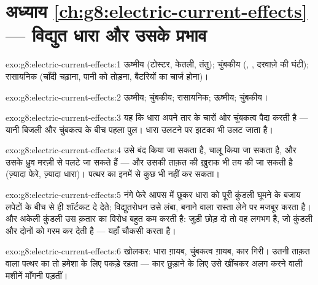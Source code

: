 \section*{अध्याय \ref{ch:g8:electric-current-effects} --- विद्युत धारा और उसके प्रभाव}

\begin{solution}{exo:g8:electric-current-effects:1}
ऊष्मीय (टोस्टर, केतली, तंतु); चुंबकीय (, , दरवाज़े
की घंटी); रासायनिक (चाँदी चढ़ाना, पानी को तोड़ना, बैटरियों का चार्ज
होना)।
\end{solution}

\begin{solution}{exo:g8:electric-current-effects:2}
ऊष्मीय; चुंबकीय; रासायनिक; ऊष्मीय; चुंबकीय।
\end{solution}

\begin{solution}{exo:g8:electric-current-effects:3}
यह कि धारा अपने तार के चारों ओर चुंबकत्व पैदा करती है --- यानी बिजली
और चुंबकत्व के बीच पहला पुल। धारा उलटने पर झटका भी उलट जाता है।
\end{solution}

\begin{solution}{exo:g8:electric-current-effects:4}
उसे बंद किया जा सकता है, चालू किया जा सकता है, और उसके ध्रुव मरज़ी से
पलटे जा सकते हैं --- और उसकी ताक़त की ख़ुराक भी तय की जा सकती है
(ज़्यादा फेरे, ज़्यादा धारा)। पत्थर का  इनमें से कुछ भी नहीं कर
सकता।
\end{solution}

\begin{solution}{exo:g8:electric-current-effects:5}
नंगे फेरे आपस में छूकर धारा को पूरी कुंडली घूमने के बजाय लपेटों के
बीच से ही शॉर्टकट दे देते; विद्युतरोधन उसे लंबा,  बनाने वाला रास्ता
लेने पर मजबूर करता है। और अकेली कुंडली उस क़तार का विरोध बहुत कम करती
है: जुड़ी छोड़ दो तो वह लगभग  है, जो कुंडली और  दोनों को
गरम कर देती है --- यहाँ  चौकसी करता है।
\end{solution}

\begin{solution}{exo:g8:electric-current-effects:6}
 खोलकर: धारा ग़ायब, चुंबकत्व ग़ायब, कार गिरी। उतनी ताक़त वाला
पत्थर का  तो हमेशा के लिए पकड़े रहता --- कार छुड़ाने के लिए उसे
खींचकर अलग करने वाली मशीनें माँगनी पड़तीं।
\end{solution}

